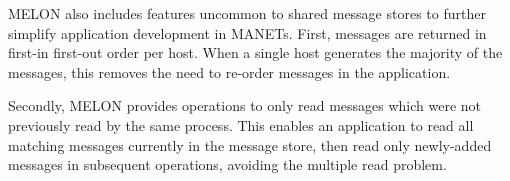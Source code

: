 \documentclass[lnicst]{svmultln}
\begin{document}





MELON also includes features uncommon to shared message stores to further simplify application development in MANETs. First, messages are returned in first-in first-out order per host. When a single host generates the majority of the messages, this removes the need to re-order messages in the application. 

Secondly, MELON provides operations to only read messages which were not previously read by the same process. This enables an application to read all matching messages currently in the message store, then read only newly-added messages in subsequent operations, avoiding the multiple read problem\cite{mrdp}.
\end{document}
